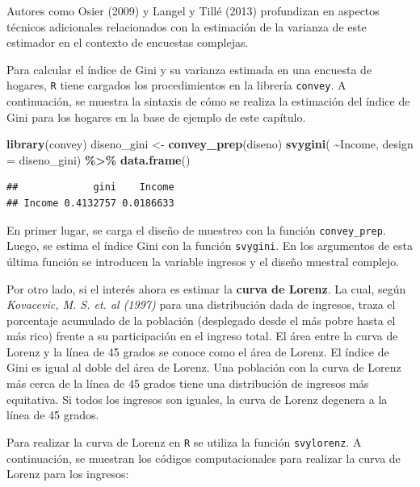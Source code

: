 \documentclass[
  12pt,
]{book}
\newenvironment{Shaded}{\begin{snugshade}}{\end{snugshade}}
\newcommand{\AttributeTok}[1]{\textcolor[rgb]{0.13,0.29,0.53}{#1}}
\newcommand{\FunctionTok}[1]{\textcolor[rgb]{0.13,0.29,0.53}{\textbf{#1}}}
\newcommand{\NormalTok}[1]{#1}
\newcommand{\OtherTok}[1]{\textcolor[rgb]{0.56,0.35,0.01}{#1}}
\newcommand{\SpecialCharTok}[1]{\textcolor[rgb]{0.81,0.36,0.00}{\textbf{#1}}}
\begin{document}
Autores como Osier (2009) y Langel y Tillé (2013) profundizan en aspectos técnicos adicionales relacionados con la estimación de la varianza de este estimador en el contexto de encuestas complejas.

Para calcular el índice de Gini y su varianza estimada en una encuesta de hogares, \texttt{R} tiene cargados los procedimientos en la librería \texttt{convey}. A continuación, se muestra la sintaxis de cómo se realiza la estimación del índice de Gini para los hogares en la base de ejemplo de este capítulo.

\begin{Shaded}
\begin{Highlighting}[]
\FunctionTok{library}\NormalTok{(convey)}
\NormalTok{ diseno\_gini }\OtherTok{\textless{}{-}} \FunctionTok{convey\_prep}\NormalTok{(diseno)}
\FunctionTok{svygini}\NormalTok{( }\SpecialCharTok{\textasciitilde{}}\NormalTok{Income, }\AttributeTok{design =}\NormalTok{ diseno\_gini) }\SpecialCharTok{\%\textgreater{}\%}
  \FunctionTok{data.frame}\NormalTok{()}
\end{Highlighting}
\end{Shaded}

\begin{verbatim}
##             gini    Income
## Income 0.4132757 0.0186633
\end{verbatim}

En primer lugar, se carga el diseño de muestreo con la función \texttt{convey\_prep}. Luego, se estima el índice Gini con la función \texttt{svygini}. En los argumentos de esta última función se introducen la variable ingresos y el diseño muestral complejo.

Por otro lado, si el interés ahora es estimar la \textbf{curva de Lorenz}. La cual, según \emph{Kovacevic, M. S. et. al (1997)} para una distribución dada de ingresos, traza el porcentaje acumulado de la población (desplegado desde el más pobre hasta el más rico) frente a su participación en el ingreso total. El área entre la curva de Lorenz y la línea de 45 grados se conoce como el área de Lorenz. El índice de Gini es igual al doble del área de Lorenz. Una población con la curva de Lorenz más cerca de la línea de 45 grados tiene una distribución de ingresos más equitativa. Si todos los ingresos son iguales, la curva de Lorenz degenera a la línea de 45 grados.

Para realizar la curva de Lorenz en \texttt{R} se utiliza la función \texttt{svylorenz}. A continuación, se muestran los códigos computacionales para realizar la curva de Lorenz para los ingresos:
\end{document}
